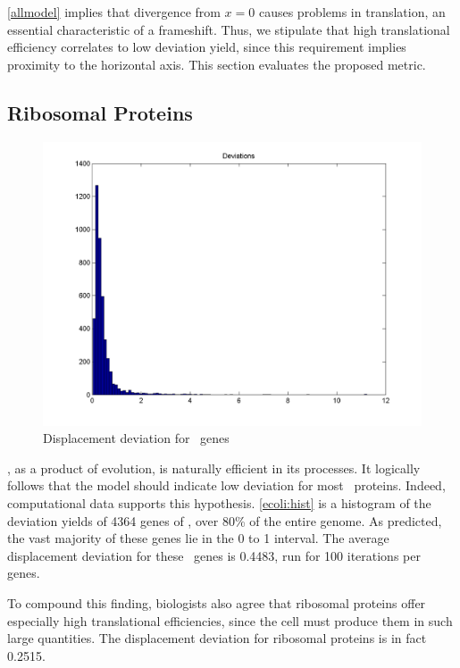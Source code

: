 \documentclass[12pt, draft]{article}
\numberwithin{equation}{section}
\begin{document}
\autoref{allmodel} implies that divergence from $x=0$ causes
problems in translation, an essential characteristic
of a frameshift.  Thus, we stipulate that high translational efficiency correlates to low deviation yield,
since this requirement implies proximity to the horizontal axis.  This section
evaluates the proposed metric.

\subsection{Ribosomal Proteins}


\begin{figure}
  \centering
  \caption{Displacement deviation for \ecoli\ genes}
  \label{ecoli:hist}
  \includegraphics[scale=0.2]{histograms/everything}
\end{figure}

\ecoli, as a product of evolution, is naturally efficient in its
processes.  It logically follows that the model should indicate low deviation
for most \ecoli\ proteins.  Indeed, computational data supports this hypothesis.
\autoref{ecoli:hist} is a histogram of the deviation yields of 4364 genes of
\ecoli, over 80\% of the entire genome.  As predicted, the vast majority
of these genes lie in the 0 to 1 interval.  The average displacement deviation
for these \ecoli\ genes is 0.4483, run for 100 iterations per genes.

To compound this finding, biologists also agree that ribosomal proteins
offer especially high translational efficiencies, since the cell must produce
them in such large quantities.  The displacement deviation for ribosomal
proteins is in fact 0.2515.
\end{document}
